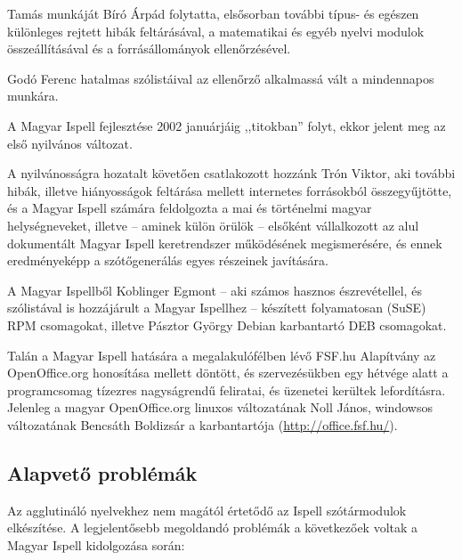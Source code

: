 Tamás munkáját Bíró Árpád folytatta, elsősorban további
típus- és egészen különleges rejtett hibák feltárásával,
a matematikai és egyéb nyelvi modulok összeállításával
és a forrásállományok ellenőrzésével. 

Godó Ferenc hatalmas szólistáival az ellenőrző alkalmassá vált
a mindennapos munkára.

A Magyar Ispell fejlesztése 2002 januárjáig ,,titokban''
folyt, ekkor jelent meg az első nyilvános változat.

A nyilvánosságra hozatalt követően csatlakozott
hozzánk Trón Viktor, aki további
hibák, illetve hiányosságok feltárása mellett internetes
forrásokból összegyűjtötte, és a Magyar Ispell számára feldolgozta
a mai és történelmi magyar helységneveket, illetve --
aminek külön örülök -- elsőként vállalkozott
az alul dokumentált Magyar Ispell keretrendszer
működésének megismerésére, és ennek eredményeképp
a szótőgenerálás egyes részeinek javítására.

A Magyar Ispellből Koblinger Egmont -- aki
számos hasznos észrevétellel, és szólistával
is hozzájárult a Magyar Ispellhez -- készített folyamatosan
(SuSE) RPM csomagokat, illetve Pásztor György Debian 
karbantartó DEB csomagokat.

Talán a Magyar Ispell hatására a megalakulófélben
lévő FSF.hu Alapítvány az OpenOffice.org
honosítása mellett döntött, és szervezésükben
egy hétvége alatt a programcsomag tízezres nagyságrendű
feliratai, és üzenetei kerültek lefordításra.
Jelenleg a magyar OpenOffice.org linuxos változatának
Noll János, windowsos változatának Bencsáth Boldizsár a karbantartója
(\url{http://office.fsf.hu/}).

\subsection{Alapvető problémák}

Az agglutináló nyelvekhez nem magától értetődő az
Ispell szótármodulok elkészítése. A legjelentősebb megoldandó
problémák a következőek voltak a
Magyar Ispell kidolgozása során:

